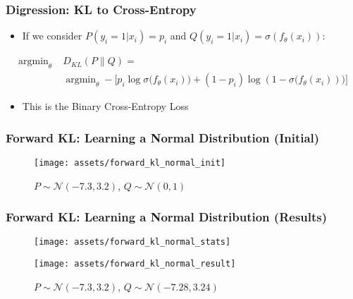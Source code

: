 \documentclass{beamer}
\DeclareMathOperator*{\argmin}{argmin}
\begin{document}
\begin{frame}
  \frametitle{Digression: KL to Cross-Entropy}
  \begin{itemize}
    \item If we consider $P(y_i = 1 | x_i) = p_i$ and $Q(y_i = 1 | x_i) = \sigma(f_\theta (x_i))$:
  \end{itemize}
  \begin{equation*}
    \begin{aligned}
      \argmin_{\theta} \; & D_{KL} (P \parallel Q) = \\
        & \argmin_{\theta} - \Big[ p_i \log \sigma\big(f_\theta (x_i)\big) + (1 - p_i) \log (1 - \sigma \big(f_\theta (x_i))\big) \Big]
    \end{aligned}
  \end{equation*}
  \begin{itemize}
    \item This is the Binary Cross-Entropy Loss
  \end{itemize}
\end{frame}


\begin{frame}
  \frametitle{Forward KL: Learning a Normal Distribution (Initial)}
  \begin{figure}
    \centering
    \texttt{[image: assets/forward\_kl\_normal\_init]}
    \caption{$P \sim \mathcal{N}(-7.3, 3.2)$, $Q \sim \mathcal{N}(0, 1)$}
  \end{figure}
\end{frame}

\begin{frame}
  \frametitle{Forward KL: Learning a Normal Distribution (Results)}
  \begin{figure}
    \centering
    \texttt{[image: assets/forward\_kl\_normal\_stats]}
  \end{figure}
  \begin{figure}
    \centering
    \texttt{[image: assets/forward\_kl\_normal\_result]}
    \caption{$P \sim \mathcal{N}(-7.3, 3.2)$, $Q \sim \mathcal{N}(-7.28, 3.24)$}
  \end{figure}
\end{frame}
\end{document}
